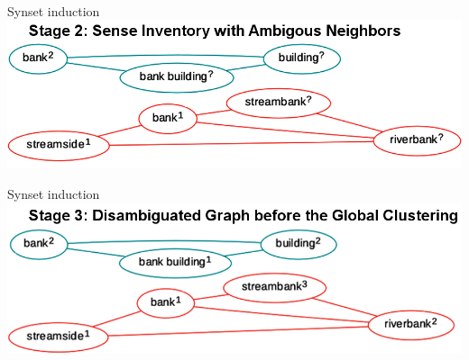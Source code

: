 \begin{frame}{Synset induction}
\centering\includegraphics[width=1\textwidth]{figures/stages2}	
\end{frame}



\begin{frame}{Synset induction}
\centering\includegraphics[width=1\textwidth]{figures/stages3}	
\end{frame}


